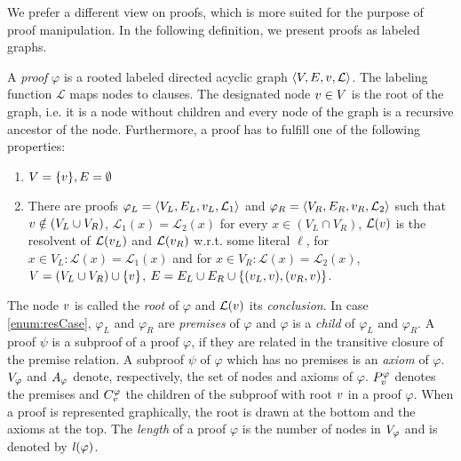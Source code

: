 We prefer a different view on proofs, which is more suited for the purpose of proof manipulation.
In the following definition, we present proofs as labeled graphs.

\begin{definition}[Proof] 
\label{def:proof}
A \emph{proof} $\varphi$ is a rooted labeled directed acyclic graph $\langle V,E,v,\mathcal{L} \rangle$.
The labeling function $\mathcal{L}$ maps nodes to clauses.
The designated node $v \in V$ is the root of the graph, i.e. it is a node without children and every node of the graph is a recursive ancestor of the node.
Furthermore, a proof has to fulfill one of the following properties:

\begin{enumerate}
	\item $V = \{v\}, E = \emptyset$
	\item \label{enum:resCase} 
		There are proofs $\varphi_L = \langle V_L, E_L, v_L,\mathcal{L}_1 \rangle$ and $\varphi_R = \langle V_R, E_R, v_R, \mathcal{L}_2 \rangle$ such that 
		$v \notin (V_L \cup V_R)$, $\mathcal{L}_1(x) = \mathcal{L}_2(x)$ for every $x \in (V_L \cap V_R)$,
		$\mathcal{L}(v)$ is the resolvent of $\mathcal{L}(v_L)$ and $\mathcal{L}(v_R)$ w.r.t. some literal $\ell$,
		for $x \in V_L: \mathcal{L}(x) = \mathcal{L}_1(x)$ and for $x \in V_R: \mathcal{L}(x) = \mathcal{L}_2(x)$,
		$V = (V_L \cup V_R) \cup \{v \}$, $E = E_L \cup E_R \cup \{(v_L,v) , (v_R,v) \}$.
\end{enumerate}

The node $v$ is called the \emph{root} of $\varphi$ and $\mathcal{L}(v)$ its \emph{conclusion}.
In case \ref{enum:resCase}, $\varphi_L$ and $\varphi_R$ are \emph{premises} of $\varphi$ and $\varphi$ is a \emph{child} of $\varphi_L$ and $\varphi_R$.
A proof $\psi$ is a subproof of a proof $\varphi$, if they are related in the transitive closure of the premise relation.
A subproof $\psi$ of $\varphi$ which has no premises is an \emph{axiom} of $\varphi$.
$V_{\varphi}$ and $A_{\varphi}$ denote, respectively, the set of nodes and axioms of $\varphi$. 
$P_{v}^{\varphi}$ denotes the premises and $C_{v}^{\varphi}$ the children of the subproof with root $v$ in a proof $\varphi$. 
When a proof is represented graphically, the root is drawn at the bottom and the axioms at the top. 
The \emph{length} of a proof $\varphi$ is the number of nodes in $V_{\varphi}$ and is denoted by $\mathit{l}(\varphi)$.
\end{definition}

